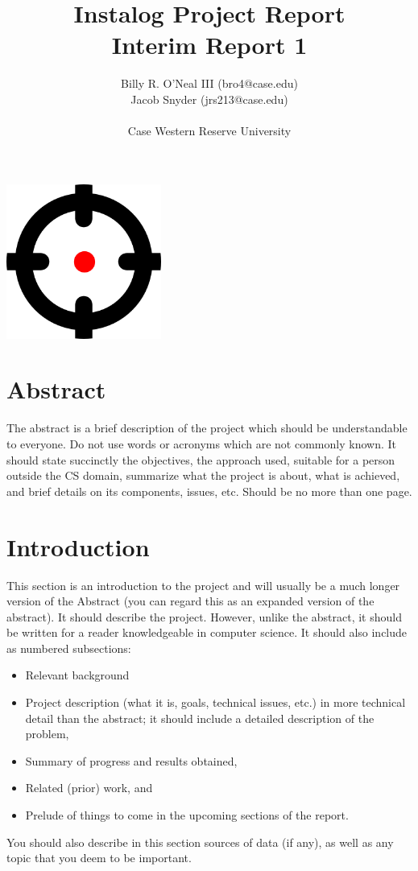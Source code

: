 \documentclass[letterpaper,12pt]{article}
\title{Instalog Project Report \\
Interim Report 1}
\author{
Billy R. O'Neal III (bro4@case.edu) \\
Jacob Snyder (jrs213@case.edu) \\ \\
Case Western Reserve University
}
\begin{document}
\maketitle
\vspace{1in}
\begin{center}
\includegraphics[width=2in, height=2in]{figures/InstalogLogo.png}
\end{center}
\newpage



\tableofcontents
\newpage



\section{Abstract}
The abstract is a brief description of the project which should be
understandable to everyone. Do not use words or acronyms which are not commonly
known. It should state succinctly the objectives, the approach used, suitable
for a person outside the CS domain, summarize what the project is about, what is
achieved, and brief details on its components, issues, etc.
Should be no more than one page.
\newpage



\section{Introduction}
This section is an introduction to the project and will usually be a much longer
version of the Abstract (you can regard this as an expanded version of the
abstract). It should describe the project.
However, unlike the abstract, it should be written for a reader knowledgeable in
computer science. It should also include as numbered subsections:
\begin{itemize}
  \item Relevant background	
  \item Project description (what it is, goals, technical issues, etc.) in more
  technical detail than the abstract; it should include a detailed description of the problem, 
  \item Summary of progress and results obtained,
  \item Related (prior) work, and
  \item Prelude of things to come in the upcoming sections of the report. 
\end{itemize}
You should also describe in this section sources of data (if any), as well as
any topic that you deem to be important.
\newpage
\end{document}
